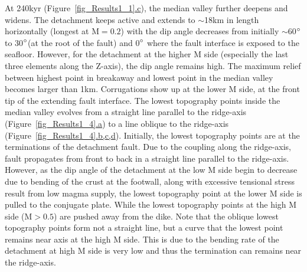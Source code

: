 At 240kyr (Figure~\hyperref[fig_Results1_1]{\ref{fig_Results1_1}.c}), the median valley further deepens and widens. The detachment keeps active and extends to $\sim$18km in length horizontally (longest at M$=0.2$) with the dip angle decreases from initially $\sim$60$\degree$ to 30$\degree$(at the root of the fault) and 0$\degree$ where the fault interface is exposed to the seafloor. However, for the detachment at the higher M side (especially the last three elements along the Z-axis), the dip angle remains high. The maximum relief between highest point in breakaway and lowest point in the median valley becomes larger than 1km. Corrugations show up at the lower M side, at the front tip of the extending fault interface. The lowest topography points inside the median valley evolves from a straight line parallel to the ridge-axis (Figure~\hyperref[fig_Results1_4]{\ref{fig_Results1_4}.a}) to a line oblique to the ridge-axis (Figure~\hyperref[fig_Results1_4]{\ref{fig_Results1_4}.b,c,d}). Initially, the lowest topography points are at the terminations of the detachment fault. Due to the coupling along the ridge-axis, fault propagates from front to back in a straight line parallel to the ridge-axis. However, as the dip angle of the detachment at the low M side begin to decrease due to bending of the crust at the footwall, along with excessive tensional stress result from low magma supply, the lowest topography point at the lower M side is pulled to the conjugate plate. While the lowest topography points at the high M side (M$>0.5$) are pushed away from the dike. Note that the oblique lowest topography points form not a straight line, but a curve that the lowest point remains near axis at the high M side. This is due to the bending rate of the detachment at high M side is very low and thus the termination can remains near the ridge-axis.      

